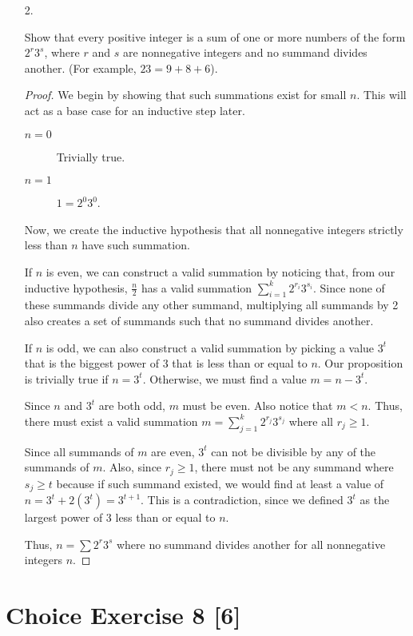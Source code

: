 \documentclass{article}
\begin{document}
\begin{enumerate}
    \item[2.] {
        Show that every positive integer is a sum of one or more numbers of the 
        form \(2^r3^s\), where \(r\) and \(s\) are nonnegative integers and no 
        summand divides another. (For example, \(23 = 9 + 8 + 6\)).

        \begin{proof}
            We begin by showing that such summations exist for small \(n\). This 
            will act as a base case for an inductive step later.

            \begin{description}
                \item[\(n=0\)] Trivially true.
                \item[\(n=1\)] \(1 = 2^0 3^0\).
            \end{description}

            Now, we create the inductive hypothesis that all nonnegative 
            integers strictly less than \(n\) have such summation.

            If \(n\) is even, we can construct a valid summation by noticing 
            that, from our inductive hypothesis, \(\frac{n}{2}\) has a valid summation 
            \(\sum_{i=1}^{k}2^{r_i}3^{s_i}\). Since none of these summands divide 
            any other summand, multiplying all summands by 2 also creates a set 
            of summands such that no summand divides another.

            If \(n\) is odd, we can also construct a valid summation by picking 
            a value \(3^t\) that is the biggest power of 3 that is less than or 
            equal to \(n\). Our proposition is trivially true if \(n = 3^t\). 
            Otherwise, we must find a value \(m = n - 3^t\).

            Since \(n\) and \(3^t\) are both odd, \(m\) must be even. Also notice 
            that \(m < n\). Thus, there must exist a valid summation
            \(m = \sum_{j=1}^{k}2^{r_j}3^{s_j}\) where all \(r_j \ge 1\).

            Since all summands of \(m\) are even, \(3^t\) can not be divisible 
            by any of the summands of \(m\). Also, since \(r_j \ge 1\), there 
            must not be any summand where \(s_j \ge t\) because if such summand 
            existed, we would find at least a value of 
            \(n = 3^t + 2(3^t) = 3^{t+1}\). This is a contradiction, since we 
            defined \(3^t\) as the largest power of 3 less than or equal to \(n\).

            Thus, \(n = \sum 2^r3^s\) where no summand divides another for all 
            nonnegative integers \(n\).
        \end{proof}
    }
\end{enumerate}

\section*{Choice Exercise 8 [6]}
\end{document}

